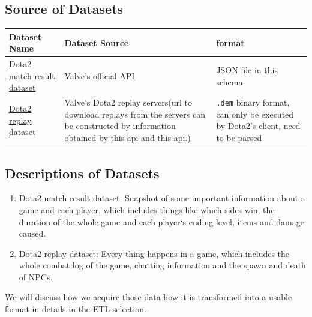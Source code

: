 \documentclass{article}
\newcommand{\codeinline}[1]{
    \texttt{#1}
}
\begin{document}
\subsection{Source of Datasets}

\begin{center}
    \begin{tabular}{|p{4.5cm}|p{6cm}|p{2.5cm}|}
    \hline
    Dataset Name & Dataset Source & format \\
    \hline\hline
    \href{https://wiki.teamfortress.com/wiki/WebAPI/GetMatchDetails}{Dota2 match result dataset} & \href{https://wiki.teamfortress.com/wiki/WebAPI}{Valve's official API} & JSON file in \href{https://wiki.teamfortress.com/wiki/WebAPI/GetMatchDetails}{this schema}\\
    \hline
    \href{https://wiki.teamfortress.com/wiki/Replay}{Dota2 replay dataset} & Valve's Dota2 replay servers(url to download replays from the servers can  be constructed by information obtained by \href{https://docs.opendota.com/}{this api} and \href{https://wiki.teamfortress.com/wiki/WebAPI/GetMatchDetails}{this api}.) & \codeinline{.dem} binary format, can only be executed by Dota2's client, need to be parsed\\
    \hline
    \end{tabular}
\end{center}

\subsection{Descriptions of Datasets}
\begin{enumerate}
\item Dota2 match result dataset: Snapshot of some important information about a game and each player, which includes things like which sides win, the duration of the whole game and each player‘s ending level, items and damage caused.
\item Dota2 replay dataset: Every thing happens in a game, which includes the whole combat log of the game, chatting information and the spawn and death of NPCs.
\end{enumerate}

We will discuss how we acquire those data how it is transformed into a usable format in details in the ETL selection.
\end{document}
